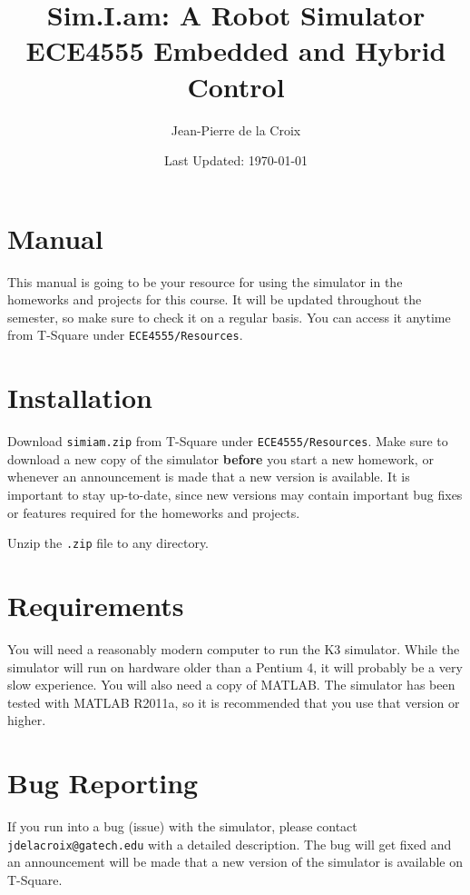 \documentclass[10pt]{article}
\begin{document}
\title{{\huge{\bf{Sim.I.am: A Robot Simulator }}}\\
{{ECE4555 Embedded and Hybrid Control}}}
\author{Jean-Pierre de la Croix}
\date{Last Updated: \today}

\maketitle

\section*{Manual}
This manual is going to be your resource for using the simulator in the homeworks and projects for this course. It will be updated throughout the semester, so make sure to check it on a regular basis. You can access it anytime from T-Square under \texttt{ECE4555/Resources}.

\section*{Installation}

Download \texttt{simiam.zip} from T-Square under \texttt{ECE4555/Resources}. Make sure to download a new copy of the simulator \textbf{before} you start a new homework, or whenever an announcement is made that a new version is available. It is important to stay up-to-date, since new versions may contain important bug fixes or features required for the homeworks and projects.

Unzip the \texttt{.zip} file to any directory.

\section*{Requirements}

You will need a reasonably modern computer to run the K3 simulator. While the simulator will run on hardware older than a Pentium 4, it will probably be a very slow experience. You will also need a copy of MATLAB. The simulator has been tested with MATLAB R2011a, so it is recommended that you use that version or higher.

\section*{Bug Reporting}
If you run into a bug (issue) with the simulator, please contact \texttt{jdelacroix@gatech.edu} with a detailed description. The bug will get fixed and an announcement will be made that a new version of the simulator is available on T-Square.
\end{document}
